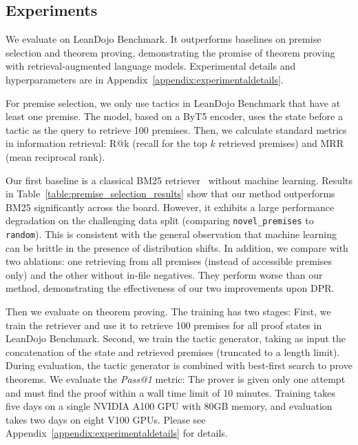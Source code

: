 
\subsection{Experiments}
\label{sec:experiments}

We evaluate {\name} on LeanDojo Benchmark. It outperforms baselines on premise selection and theorem proving, demonstrating the promise of theorem proving with retrieval-augmented language models. Experimental details and hyperparameters are in Appendix~\ref{appendix:experimentaldetails}.



For premise selection, we only use tactics in LeanDojo Benchmark that have at least one premise. The model, based on a ByT5 encoder, uses the state before a tactic as the query to retrieve 100 premises. Then, we calculate standard metrics in information retrieval: R@k (recall for the top $k$ retrieved premises) and MRR (mean reciprocal rank). 


Our first baseline is a classical BM25 retriever~\cite{robertson2009probabilistic} without machine learning. Results in Table~\ref{table:premise_selection_results} show that our method outperforms BM25 significantly across the board. However, it exhibits a large performance degradation on the challenging data split (comparing \texttt{novel\_premises} to \texttt{random}). This is consistent with the general observation that machine learning can be brittle in the presence of distribution shifts. In addition, we compare with two ablations: one retrieving from all premises (instead of accessible premises only) and the other without in-file negatives. They perform worse than our method, demonstrating the effectiveness of our two improvements upon DPR.



Then we evaluate {\name} on theorem proving. The training has two stages: First, we train the retriever and use it to retrieve 100 premises for all proof states in LeanDojo Benchmark. Second, we train the tactic generator, taking as input the concatenation of the state and retrieved premises (truncated to a length limit). During evaluation, the tactic generator is combined with best-first search to prove theorems. We evaluate the \emph{Pass@1} metric: The prover is given only one attempt and must find the proof within a wall time limit of 10 minutes. Training takes five days on a single NVIDIA A100 GPU with 80GB memory, and evaluation takes two days on eight V100 GPUs. Please see Appendix~\ref{appendix:experimentaldetails} for details.


